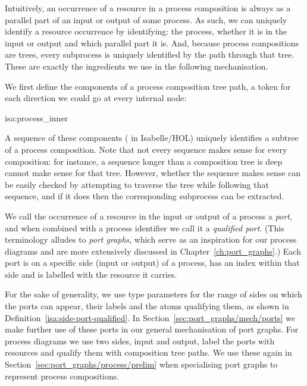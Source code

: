 \documentclass[class=smolathesis,crop=false]{standalone}
\begin{document}
Intuitively, an occurrence of a resource in a process composition is always as a parallel part of an input or output of some process.
As such, we can uniquely identify a resource occurrence by identifying: the process, whether it is in the input or output and which parallel part it is.
And, because process compositions are trees, every subprocess is uniquely identified by the path through that tree.
These are exactly the ingredients we use in the following mechanisation.

We first define the components of a process composition tree path, a token for each direction we could go at every internal node:
\begin{isadef}{isa:process_inner}
  
\end{isadef}

A sequence of these components ( in Isabelle/HOL) uniquely identifies a subtree of a process composition.
Note that not every sequence makes sense for every composition: for instance, a sequence longer than a composition tree is deep cannot make sense for that tree.
However, whether the sequence makes sense can be easily checked by attempting to traverse the tree while following that sequence, and if it does then the corresponding subprocess can be extracted.

We call the occurrence of a resource in the input or output of a process a \emph{port}, and when combined with a process identifier we call it a \emph{qualified port}.
(This terminology alludes to \emph{port graphs}, which serve as an inspiration for our process diagrams and are more extensively discussed in Chapter~\ref{ch:port_graphs}.)
Each port is on a specific side (input or output) of a process, has an index within that side and is labelled with the resource it carries.

\cbstart
For the sake of generality, we use type parameters for the range of sides on which the ports can appear, their labels and the atoms qualifying them, as shown in Definition~\ref{isa:side-port-qualified}.
In Section~\ref{sec:port_graphs/mech/ports} we make further use of these ports in our general mechanisation of port graphs.
For process diagrams we use two sides, input and output, label the ports with resources and qualify them with composition tree paths.
We use these again in Section~\ref{sec:port_graphs/process/prelim} when specialising port graphs to represent process compositions.
\end{document}
